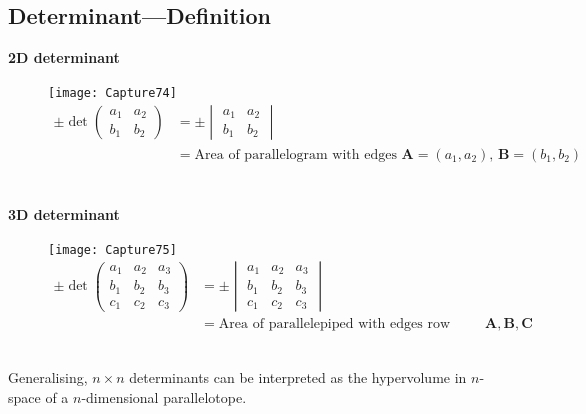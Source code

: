 \documentclass{report}
\begin{document}
\subsection{Determinant---Definition} %
\textbf{2D determinant}
\begin{figure}[h]
\texttt{[image: Capture74]}\\
\centering
\begin{align*}
\pm\det
\begin{pmatrix}
a_1 & a_2\\
b_1 & b_2
\end{pmatrix}
&=\pm
\begin{vmatrix}
a_1 & a_2\\
b_1 & b_2
\end{vmatrix}\\
&=\text{Area of parallelogram with edges $\mathbf{A}=(a_1,a_2)$, $\mathbf{B}=(b_1,b_2)$}\\
\end{align*}
\end{figure}\\
\textbf{3D determinant}
\begin{figure}[h]
\texttt{[image: Capture75]}\\
\centering
\begin{align*}
\pm\det
\begin{pmatrix}
a_1 & a_2 & a_3\\
b_1 & b_2 & b_3\\
c_1 & c_2 & c_3
\end{pmatrix}
&=\pm
\begin{vmatrix}
a_1 & a_2 & a_3\\
b_1 & b_2 & b_3\\
c_1 & c_2 & c_3
\end{vmatrix}\\
&=\text{Area of parallelepiped with edges row vectors $\mathbf{A,B,C}$}.
\end{align*}
\end{figure}\\
Generalising, $n\times n$ determinants can be interpreted as the hypervolume 
in $n$-space of a $n$-dimensional parallelotope.
\newpage
\end{document}
